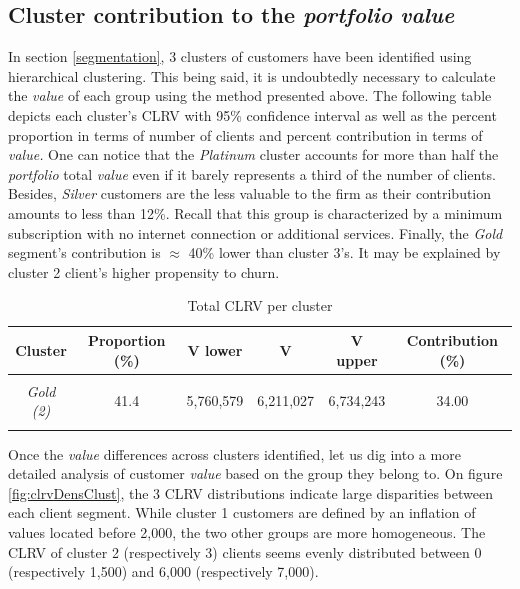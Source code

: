 \documentclass[
]{book}
\begin{document}
\hypertarget{cluster-contribution-to-the-portfolio-value}{%
\subsection{\texorpdfstring{Cluster contribution to the \emph{portfolio} \emph{value}}{Cluster contribution to the portfolio value}}\label{cluster-contribution-to-the-portfolio-value}}

In section \ref{segmentation}, 3 clusters of customers have been identified using hierarchical clustering. This being said, it is undoubtedly necessary to calculate the \emph{value} of each group using the method presented above. The following table depicts each cluster's CLRV with 95\% confidence interval as well as the percent proportion in terms of number of clients and percent contribution in terms of \emph{value.} One can notice that the \emph{Platinum} cluster accounts for more than half the \emph{portfolio} total \emph{value} even if it barely represents a third of the number of clients. Besides, \emph{Silver} customers are the less valuable to the firm as their contribution amounts to less than 12\%. Recall that this group is characterized by a minimum subscription with no internet connection or additional services. Finally, the \emph{Gold} segment's contribution is \(\approx\) 40\% lower than cluster 3's. It may be explained by cluster 2 client's higher propensity to churn.

\begin{table}[H]

\caption{\label{tab:totValclust}Total CLRV per cluster}
\centering
\begin{tabular}[t]{>{}cccccc}
\toprule
Cluster & Proportion (\%) & V lower & V & V upper & Contribution (\%)\\
\midrule
\em{\cellcolor{gray!6}{Silver (1)}} & \cellcolor{gray!6}{26.6} & \cellcolor{gray!6}{2,035,928} & \cellcolor{gray!6}{2,117,932} & \cellcolor{gray!6}{2,213,746} & \cellcolor{gray!6}{11.59}\\
\em{Gold (2)} & 41.4 & 5,760,579 & 6,211,027 & 6,734,243 & 34.00\\
\em{\cellcolor{gray!6}{Platinum (3)}} & \cellcolor{gray!6}{32.1} & \cellcolor{gray!6}{9,807,637} & \cellcolor{gray!6}{9,941,041} & \cellcolor{gray!6}{10,083,660} & \cellcolor{gray!6}{54.41}\\
\bottomrule
\end{tabular}
\end{table}

Once the \emph{value} differences across clusters identified, let us dig into a more detailed analysis of customer \emph{value} based on the group they belong to. On figure \ref{fig:clrvDensClust}, the 3 CLRV distributions indicate large disparities between each client segment. While cluster 1 customers are defined by an inflation of values located before 2,000, the two other groups are more homogeneous. The CLRV of cluster 2 (respectively 3) clients seems evenly distributed between 0 (respectively 1,500) and 6,000 (respectively 7,000).
\end{document}
